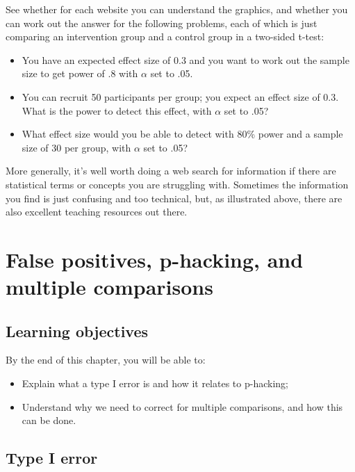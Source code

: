 \documentclass{krantz}
\providecommand{\tightlist}{%
\setlength{\itemsep}{0pt}\setlength{\parskip}{0pt}}
\begin{document}
See whether for each website you can understand the graphics, and whether you can work out the answer for the following problems, each of which is just comparing an intervention group and a control group in a two-sided t-test:
\begin{itemize}
\tightlist
\item
You have an expected effect size of 0.3 and you want to work out the sample size to get power of .8 with \(\alpha\) set to .05.
\item
You can recruit 50 participants per group; you expect an effect size of 0.3. What is the power to detect this effect, with \(\alpha\) set to .05?
\item
What effect size would you be able to detect with 80\% power and a sample size of 30 per group, with \(\alpha\) set to .05?
\end{itemize}

More generally, it's well worth doing a web search for information if there are statistical terms or concepts you are struggling with. Sometimes the information you find is just confusing and too technical, but, as illustrated above, there are also excellent teaching resources out there.

\hypertarget{phacking}{%
\chapter{False positives, p-hacking, and multiple comparisons}\label{phacking}}

\hypertarget{learning-objectives-12}{%
\section{Learning objectives}\label{learning-objectives-12}}

By the end of this chapter, you will be able to:

\begin{itemize}
\item
  Explain what a type I error is and how it relates to p-hacking;
\item
  Understand why we need to correct for multiple comparisons, and how this can be done.
\end{itemize}

\hypertarget{type-i-error}{%
\section{Type I error}\label{type-i-error}}
\end{document}

